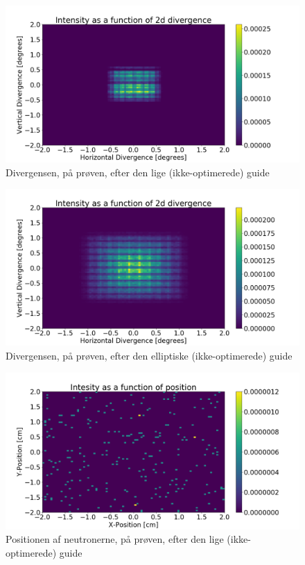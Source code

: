 \documentclass[12pt,oneside,a4paper]{article}
\begin{document}
{{{{{\begin{figure}[H]
\centering
\includegraphics[width=1\textwidth]{div_straight_after.png}
\caption{Divergensen, på prøven, efter den lige (ikke-optimerede) guide}  \label{ap:div_straight_after}
\end{figure}


\begin{figure}[H]
\centering
\includegraphics[width=1\textwidth]{div_ellipse_after.png}
\caption{Divergensen, på prøven, efter den elliptiske (ikke-optimerede) guide} \label{ap:div_ellipse_after}
\end{figure}


\begin{figure}[H]
\centering
\includegraphics[width=1\textwidth]{psd_straight_after.png}
\caption{Positionen af neutronerne, på prøven, efter den lige  (ikke-optimerede) guide}
\end{figure}

}}}}}
\end{document}
